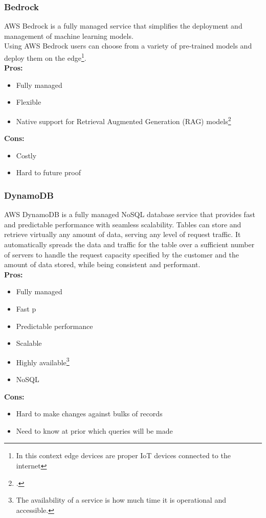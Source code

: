         \subsubsection{Bedrock}
        \label{aws:bedrock}
 AWS Bedrock is a fully managed service that simplifies the deployment and management of machine learning models.\\
 Using AWS Bedrock users can choose from a variety of pre-trained models and deploy them on the edge\footnote{In this context edge devices are proper IoT devices connected to the internet}.\\
        \textbf{Pros:}
        \begin{itemize}
            \item Fully managed
            \item Flexible
            \item Native support for Retrieval Augmented Generation (RAG) models\footcite{site:rag}
        \end{itemize}
        \textbf{Cons:}
        \begin{itemize}
            \item Costly
            \item Hard to future proof
        \end{itemize}

        \subsubsection{DynamoDB}
        \label{aws:dynamodb}
 AWS DynamoDB is a fully managed NoSQL database service that provides fast and predictable performance with seamless scalability.
 Tables can store and retrieve virtually any amount of data, serving any level of request traffic.
 It automatically spreads the data and traffic for the table over a sufficient number of servers to handle the request capacity specified by the customer and the amount of data stored, while being consistent and performant.\\
        \textbf{Pros:}
        \begin{itemize}
            \item Fully managed
            \item Fast p
            \item Predictable performance
            \item Scalable
            \item Highly available\footnote{The availability of a service is how much time it is operational and accessible.}
            \item NoSQL
        \end{itemize}
        \textbf{Cons:}
        \begin{itemize}
            \item Hard to make changes against bulks of records
            \item Need to know at prior which queries will be made
        \end{itemize}

